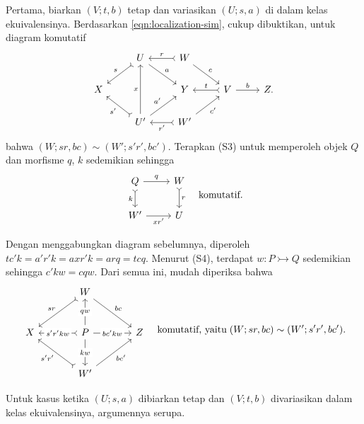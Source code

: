 \begin{bukti}
	Pertama, biarkan $(V; t, b)$ tetap dan variasikan $(U; s, a)$ di dalam kelas
	ekuivalensinya. Berdasarkan \eqref{eqn:localization-sim}, cukup dibuktikan,
	untuk diagram komutatif
	\[\begin{tikzcd}
		& U \arrow[rightarrowtail, ld, "s"'] \arrow[rd, "a"] & W \arrow[rightarrowtail, l, "r"'] \arrow[rd, "c"] & & \\
		X & & Y & V \arrow[r, "b"] \arrow[rightarrowtail, l, "t"'] & Z . \\
		& U' \arrow[rightarrowtail, lu, "{s'}"] \arrow[ru, "{a'}"] \arrow[uu, "x"] & W' \arrow[rightarrowtail, l, "{r'}"] \arrow[ru, "{c'}"'] & &
	\end{tikzcd}\]
	bahwa $(W; sr, bc) \sim (W'; s'r', bc')$. Terapkan (S3) untuk memperoleh
	objek $Q$ dan morfisme $q$, $k$ sedemikian sehingga
	\[\begin{tikzcd}
		Q \arrow[rightarrowtail, d, "k"'] \arrow[r, "q"] & W \arrow[rightarrowtail, d, "r"] \\
		W' \arrow[r, "{xr'}"'] & U
	\end{tikzcd} \quad \text{komutatif}. \]

	Dengan menggabungkan diagram sebelumnya, diperoleh
	$tc'k = a'r'k = axr'k = arq = tcq$. Menurut (S4), terdapat
	$w: P \rightarrowtail Q$ sedemikian sehingga $c'kw = cqw$. Dari semua ini,
	mudah diperiksa bahwa
	\[\begin{tikzcd}[column sep=large, row sep=large]
		& W \arrow[rightarrowtail, ld, "sr"'] \arrow[rd, "bc"] & \\
		X & P \arrow[r, "{bc'kw}" description] \arrow[rightarrowtail, l, "{s'r'kw}" description] \arrow[u, "qw" description] \arrow[d, "{kw}" description] & Z \\
		& W' \arrow[rightarrowtail, lu, "{s'r'}"] \arrow[ru, "{bc'}"'] &
	\end{tikzcd} \quad \text{komutatif, yaitu}\; (W; sr, bc) \sim (W'; s'r', bc'). \]

	Untuk kasus ketika $(U; s, a)$ dibiarkan tetap dan $(V; t, b)$ divariasikan
	dalam kelas ekuivalensinya, argumennya serupa.
\end{bukti}

